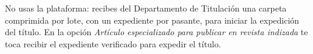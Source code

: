\documentclass[11pt,a4paper]{article}
\begin{document}
{\small\tableofcontents}
\newpage
\begin{quevasahacer}
No usas la plataforma: recibes del Departamento de Titulación una carpeta comprimida por lote, con un expediente por pasante, para iniciar la expedición del título. En la opción \emph{Artículo especializado para publicar en revista indizada} te toca recibir el expediente verificado para expedir el título.
\end{quevasahacer}



\end{document}
